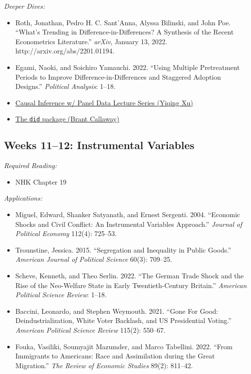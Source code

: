 \documentclass[11pt, letterpaper]{article}
\begin{document}
\noindent \textit{Deeper Dives:}

\begin{itemize}
	\item Roth, Jonathan, Pedro H. C. Sant’Anna, Alyssa Bilinski, and John Poe. ``What’s Trending in Difference-in-Differences? A Synthesis of the Recent Econometrics Literature.'' \textit{arXiv}, January 13, 2022. http://arxiv.org/abs/2201.01194.
	\item Egami, Naoki, and Soichiro Yamauchi. 2022. ``Using Multiple Pretreatment Periods to Improve Difference-in-Differences and Staggered Adoption Designs.'' \textit{Political Analysis}: 1–18.
	\item \href{https://www.youtube.com/user/ariesxyq/videos}{Causal Inference w/ Panel Data Lecture Series (Yiqing Xu)}
	\item \href{https://bcallaway11.github.io/did/articles/did-basics.html}{The \texttt{did} package (Brant Callaway)}
\end{itemize}

\subsection*{Weeks 11--12: Instrumental Variables}

\textit{Required Reading:}

\begin{itemize}
	\item NHK Chapter 19
\end{itemize}

\noindent\textit{Applications:}

\begin{itemize}
	\item Miguel, Edward, Shanker Satyanath, and Ernest Sergenti. 2004. ``Economic Shocks and Civil Conflict: An Instrumental Variables Approach.'' \textit{Journal of Political Economy} 112(4): 725–53.
	\item Trounstine, Jessica. 2015. ``Segregation and Inequality in Public Goods.'' \textit{American Journal of Political Science} 60(3): 709–25.
	\item Scheve, Kenneth, and Theo Serlin. 2022. ``The German Trade Shock and the Rise of the Neo-Welfare State in Early Twentieth-Century Britain.'' \textit{American Political Science Review}: 1–18.
	\item Baccini, Leonardo, and Stephen Weymouth. 2021. ``Gone For Good: Deindustrialization, White Voter Backlash, and US Presidential Voting.'' \textit{American Political Science Review} 115(2): 550–67.
	\item Fouka, Vasiliki, Soumyajit Mazumder, and Marco Tabellini. 2022. ``From Immigrants to Americans: Race and Assimilation during the Great Migration.'' \textit{The Review of Economic Studies} 89(2): 811–42.
\end{itemize}
\end{document}
